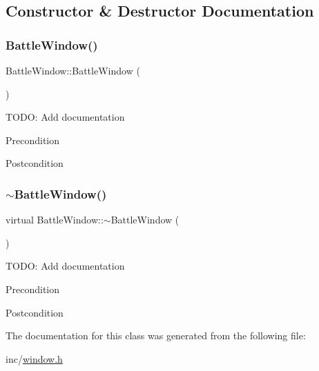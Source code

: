 \subsection{Constructor \& Destructor Documentation}
\mbox{\label{classBattleWindow_a9f7e70c225b63503da672c0c6eab0c08}} 
\subsubsection{\texorpdfstring{BattleWindow()}{BattleWindow()}}
{\footnotesize\ttfamily Battle\+Window\+::\+Battle\+Window (\begin{DoxyParamCaption}{ }\end{DoxyParamCaption})}

T\+O\+DO\+: Add documentation \begin{DoxyPrecond}{Precondition}

\end{DoxyPrecond}
\begin{DoxyPostcond}{Postcondition}

\end{DoxyPostcond}
\mbox{\label{classBattleWindow_a1407b4532e34b603c8353907b6bed45a}} 
\subsubsection{\texorpdfstring{$\sim$BattleWindow()}{~BattleWindow()}}
{\footnotesize\ttfamily virtual Battle\+Window\+::$\sim$\+Battle\+Window (\begin{DoxyParamCaption}{ }\end{DoxyParamCaption})\hspace{0.3cm}{\ttfamily [virtual]}}

T\+O\+DO\+: Add documentation \begin{DoxyPrecond}{Precondition}

\end{DoxyPrecond}
\begin{DoxyPostcond}{Postcondition}

\end{DoxyPostcond}


The documentation for this class was generated from the following file\+:\begin{DoxyCompactItemize}
\item 
inc/\mbox{\hyperlink{window_8h}{window.\+h}}\end{DoxyCompactItemize}
